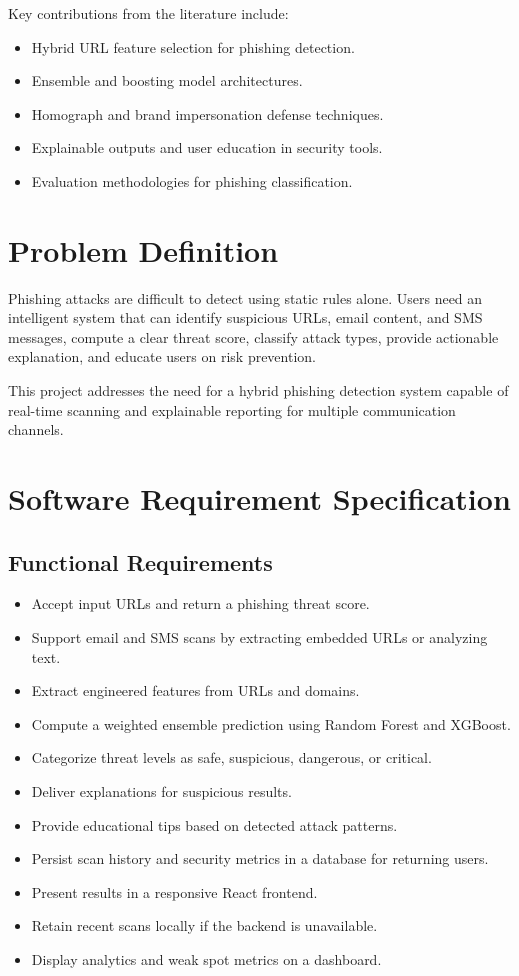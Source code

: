 \documentclass[conference]{IEEEtran}
\begin{document}
Key contributions from the literature include:
\begin{itemize}[itemsep=0pt,topsep=0pt]
    \item Hybrid URL feature selection for phishing detection.
    \item Ensemble and boosting model architectures.
    \item Homograph and brand impersonation defense techniques.
    \item Explainable outputs and user education in security tools.
    \item Evaluation methodologies for phishing classification.
\end{itemize}

\section{Problem Definition}
Phishing attacks are difficult to detect using static rules alone. Users need an intelligent system that can identify suspicious URLs, email content, and SMS messages, compute a clear threat score, classify attack types, provide actionable explanation, and educate users on risk prevention.

This project addresses the need for a hybrid phishing detection system capable of real-time scanning and explainable reporting for multiple communication channels.

\section{Software Requirement Specification}
\subsection{Functional Requirements}
\begin{itemize}[itemsep=0pt,topsep=0pt]
    \item Accept input URLs and return a phishing threat score.
    \item Support email and SMS scans by extracting embedded URLs or analyzing text.
    \item Extract engineered features from URLs and domains.
    \item Compute a weighted ensemble prediction using Random Forest and XGBoost.
    \item Categorize threat levels as safe, suspicious, dangerous, or critical.
    \item Deliver explanations for suspicious results.
    \item Provide educational tips based on detected attack patterns.
    \item Persist scan history and security metrics in a database for returning users.
    \item Present results in a responsive React frontend.
    \item Retain recent scans locally if the backend is unavailable.
    \item Display analytics and weak spot metrics on a dashboard.
\end{itemize}
\end{document}
